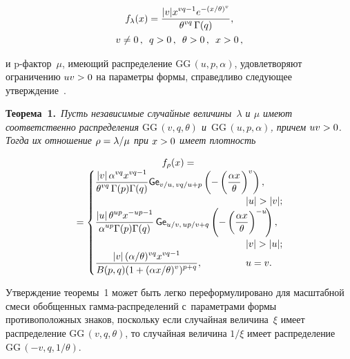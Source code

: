 \begin{multicols}{2}
\vspace*{-4pt}

\noindent
\begin{multline*}
f_\lambda(x)=\displaystyle\frac{\displaystyle |v| x^{vq -1}e^{-(x/\theta)^v}\mathstrut}{\displaystyle \theta^{vq}\,\Gamma(q)\mathstrut}, \\
v\neq0\,, \enskip q>0\,,  \enskip \theta >0\,, \enskip x>0\,,
\end{multline*}

\vspace*{-4pt}

\noindent
и p-фактор~$\mu$, имеющий распределение $\mathrm{GG}\,(u,p,\alpha)$, удовлетворяют ограничению $uv\hm>0$ 
на параметры формы, справедливо следующее утверждение~\cite{Ku2019_1}.

\smallskip

\noindent
\textbf{Теорема~1.}\ 
\textit{Пусть независимые случайные величины~$\lambda$ и $\mu$ имеют соответственно 
распределения $\mathrm{GG}\,(v,q,\theta)$ 
и~$\mathrm{GG}\,(u,p,\alpha)$, причем $uv\hm>0$. Тогда их отношение $\rho\hm=\lambda/\mu$ 
при $x\hm>0$ имеет плот\-ность}

\vspace*{-6pt}

\noindent
\begin{multline*}
f_{\rho}(x) = {}\\[-3pt]
{}= \begin{cases}
   \displaystyle \fr{\abs{v}\alpha^{vq}x^{vq-1}}{\theta^{vq}\,
   \Gamma(p)\Gamma(q)}{\sf Ge}_{v/u,\, vq/u+p}\left(-\left(\fr{\alpha x}{\theta}\right)^{v}\right), &\\
 &   \hspace*{-15mm} |u|>|v|;\\
   \displaystyle \fr{\abs{u}\theta^{up}x^{-up-1}}{\alpha^{up}\Gamma(p)\Gamma(q)}\,
   {\sf Ge}_{u/v,\, up/v+q}\left(-\left(\fr{\alpha x}{\theta}\right)^{-u}\!\right), &\hspace*{-2.96pt}\\
  &\hspace*{-15mm}|v|>|u|;\\
   \displaystyle \fr{\abs{v}(\alpha/\theta)^{vq}x^{vq-1}}{B(p,q)(1+(\alpha x/\theta)^{v})^{p+q}}, 
   &\hspace*{-15mm}u = v.
 \end{cases}
 \hspace*{-2.96pt}
\end{multline*}


Утверждение теоремы~1 может быть легко переформулировано 
для масштабной смеси обобщенных гам\-ма-рас\-пре\-де\-ле\-ний 
с~параметрами формы противоположных знаков, поскольку если случайная величина~$\xi$ 
имеет распределение $\mathrm{GG}\,(v,q,\theta)$, то случайная величина $1/\xi$ имеет распределение 
$\mathrm{GG}\,(-v,q,1/\theta)$.


\end{multicols}
